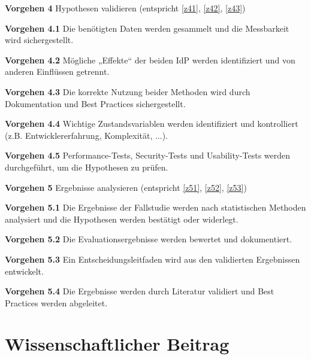 \begin{description}
    \item \textbf{Vorgehen 4} Hypothesen validieren (entspricht \ref{z41}, \ref{z42}, \ref{z43})
        \item \textbf{Vorgehen 4.1} Die benötigten Daten werden gesammelt und die Messbarkeit wird sichergestellt.
        \item \textbf{Vorgehen 4.2} Mögliche „Effekte“ der beiden \ac{IdP} werden identifiziert und von anderen Einflüssen getrennt.
        \item \textbf{Vorgehen 4.3} Die korrekte Nutzung beider Methoden wird durch Dokumentation und Best Practices sichergestellt.
        \item \textbf{Vorgehen 4.4} Wichtige Zustandsvariablen werden identifiziert und kontrolliert (z.B. Entwicklererfahrung, Komplexität, ...).
        \item \textbf{Vorgehen 4.5} Performance-Tests, Security-Tests und Usability-Tests werden durchgeführt, um die Hypothesen zu prüfen.
    
    \item \textbf{Vorgehen 5} Ergebnisse analysieren (entspricht \ref{z51}, \ref{z52}, \ref{z53})
        \item \textbf{Vorgehen 5.1} Die Ergebnisse der Fallstudie werden nach statistischen Methoden analysiert und die Hypothesen werden bestätigt oder widerlegt.
        \item \textbf{Vorgehen 5.2} Die Evaluationsergebnisse werden bewertet und dokumentiert.
        \item \textbf{Vorgehen 5.3} Ein Entscheidungsleitfaden wird aus den validierten Ergebnissen entwickelt.
        \item \textbf{Vorgehen 5.4} Die Ergebnisse werden durch Literatur validiert und Best Practices werden abgeleitet.
\end{description}


\section{Wissenschaftlicher Beitrag}

